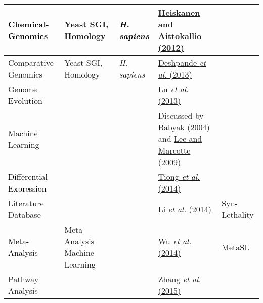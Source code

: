\begin{flushleft}
\begin{supertabular}{m{4.421cm}|m{2.342cm}|m{2.388cm}|m{4.552cm}|m{2.299cm}}
\color{black} \textcolor{black}{Chemical-Genomics} &
\color{black} Yeast SGI,
Homology &
\color{black}
\textit{\textcolor{black}{H. sapiens}} &
\color{black}
\hyperlink{ENREF48}{Heiskanen and Aittokallio (2012)} &
~
\\\hline
Comparative Genomics &
Yeast SGI, Homology &
\textit{H. sapiens} &
\hyperlink{ENREF30}{Deshpande}\hyperlink{ENREF30}{\textit{ et
al.}}\hyperlink{ENREF30}{ (2013)} &
~
\\\hline
{}\color{black}
\textcolor{black}{Genome Evolution} &
~
 &
~
 &
\color{black}
\hyperlink{ENREF73}{Lu}\hyperlink{ENREF73}{\textit{\textcolor{black}{
et al.}}}\hyperlink{ENREF73}{ (2013)} &
~
\\\hline
Machine Learning &
~
 &
~
 &
Discussed by \hyperlink{ENREF6}{Babyak (2004)} and
\hyperlink{ENREF64}{Lee and Marcotte (2009)} &
~
\\\hline
{}\color{black}
\textcolor{black}{Differential Expression} &
~
 &
~
 &
\color{black}
\hyperlink{ENREF95}{Tiong}\hyperlink{ENREF95}{\textit{\textcolor{black}{
et al.}}}\hyperlink{ENREF95}{ (2014)} &
~
\\\hline
Literature Database &
~
 &
~
 &
\hyperlink{ENREF69}{Li}\hyperlink{ENREF69}{\textit{ et
al.}}\hyperlink{ENREF69}{ (2014)} &
Syn-Lethality\\\hline
{}\color{black}
\textcolor{black}{Meta-Analysis} &
\color{black}
Meta-Analysis Machine Learning &
~
 &
\color{black}
\hyperlink{ENREF114}{Wu}\hyperlink{ENREF114}{\textit{\textcolor{black}{
et al.}}}\hyperlink{ENREF114}{ (2014)} &
\color{black}
MetaSL\\\hline
Pathway Analysis &
~
 &
~
 &
\hyperlink{ENREF117}{Zhang}\hyperlink{ENREF117}{\textit{ et
al.}}\hyperlink{ENREF117}{ (2015)} &

\end{supertabular}
\end{flushleft}
